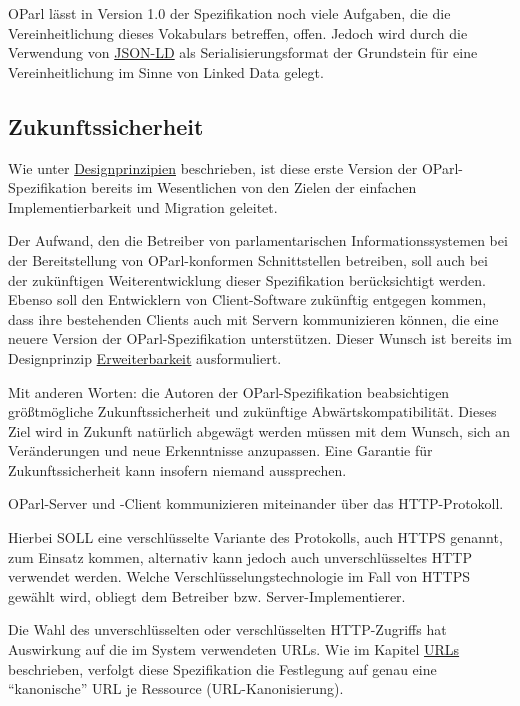 \documentclass[,a4paper]{article}
\begin{document}
OParl lässt in Version 1.0 der Spezifikation noch viele Aufgaben, die
die Vereinheitlichung dieses Vokabulars betreffen, offen. Jedoch wird
durch die Verwendung von \hyperref[jsonld]{JSON-LD} als
Serialisierungsformat der Grundstein für eine Vereinheitlichung im Sinne
von Linked Data gelegt.

\subsection{Zukunftssicherheit}\label{zukunftssicherheit}

Wie unter \hyperref[designprinzipien]{Designprinzipien} beschrieben, ist
diese erste Version der OParl-Spezifikation bereits im Wesentlichen von
den Zielen der einfachen Implementierbarkeit und Migration geleitet.

Der Aufwand, den die Betreiber von parlamentarischen
Informationssystemen bei der Bereitstellung von OParl-konformen
Schnittstellen betreiben, soll auch bei der zukünftigen
Weiterentwicklung dieser Spezifikation berücksichtigt werden. Ebenso
soll den Entwicklern von Client-Software zukünftig entgegen kommen, dass
ihre bestehenden Clients auch mit Servern kommunizieren können, die eine
neuere Version der OParl-Spezifikation unterstützen. Dieser Wunsch ist
bereits im Designprinzip \hyperref[erweiterbarkeit]{Erweiterbarkeit}
ausformuliert.

Mit anderen Worten: die Autoren der OParl-Spezifikation beabsichtigen
größtmögliche Zukunftssicherheit und zukünftige Abwärtskompatibilität.
Dieses Ziel wird in Zukunft natürlich abgewägt werden müssen mit dem
Wunsch, sich an Veränderungen und neue Erkenntnisse anzupassen. Eine
Garantie für Zukunftssicherheit kann insofern niemand aussprechen.


OParl-Server und -Client kommunizieren miteinander über das
HTTP-Protokoll.

Hierbei SOLL eine verschlüsselte Variante des Protokolls, auch HTTPS
genannt, zum Einsatz kommen, alternativ kann jedoch auch
unverschlüsseltes HTTP verwendet werden. Welche
Verschlüsselungstechnologie im Fall von HTTPS gewählt wird, obliegt dem
Betreiber bzw. Server-Implementierer.

Die Wahl des unverschlüsselten oder verschlüsselten HTTP-Zugriffs hat
Auswirkung auf die im System verwendeten URLs. Wie im Kapitel
\hyperref[urls]{URLs} beschrieben, verfolgt diese Spezifikation die
Festlegung auf genau eine ``kanonische'' URL je Ressource
(URL-Kanonisierung).
\end{document}
